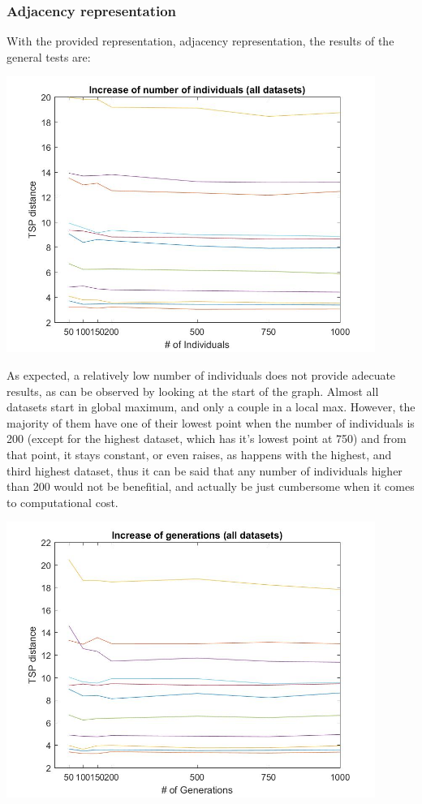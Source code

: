 \subsubsection{Adjacency representation}

With the provided representation, adjacency representation, the results of the
general tests are:

\begin{center}
\includegraphics[width=12cm]{img/xalt_edges/numberIndiv.jpg}
\end{center}

As expected, a relatively low number of individuals does not provide adecuate
results, as can be observed by looking at the start of the graph. Almost
all datasets start in global maximum, and only a couple in a local max. However,
the majority of them have one of their lowest point when the number of
individuals is 200 (except for the highest dataset, which has it's lowest
point at 750) and from that point, it stays constant, or even raises, as
happens with the highest, and third highest dataset, thus it can be said
that any number of individuals higher than 200 would not be benefitial, and
actually be just cumbersome when it comes to computational cost. 

\begin{center}
\includegraphics[width=12cm]{img/xalt_edges/numberGens.jpg}
\end{center}

